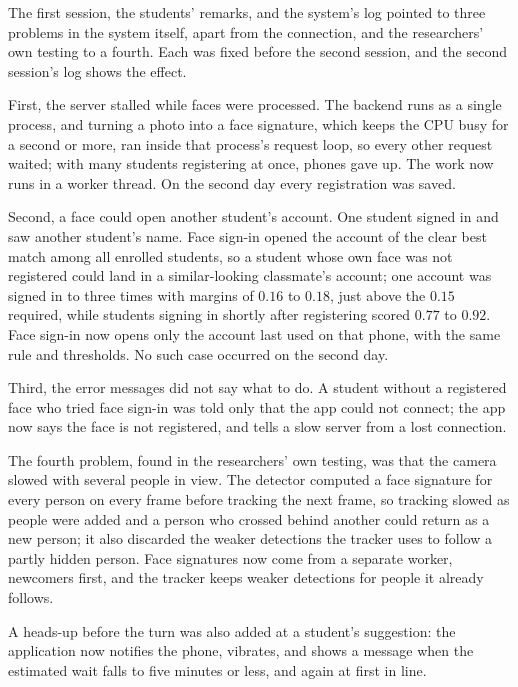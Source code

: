 \documentclass{research}
\begin{document}
\label{subsec:uat-fixes}

The first session, the students' remarks, and the system's log pointed to
three problems in the system itself, apart from the connection, and the
researchers' own testing to a fourth. Each was fixed before the second
session, and the second session's log shows the effect.

First, the server stalled while faces were processed. The backend runs
as a single process, and turning a photo into a face signature, which
keeps the CPU busy for a second or more, ran inside that process's
request loop, so every other request waited; with many students
registering at once, phones gave up. The work now runs in a worker
thread. On the second day every registration was saved.

Second, a face could open another student's account. One student signed
in and saw another student's name. Face sign-in opened the account of
the clear best match among all enrolled students, so a student whose own
face was not registered could land in a similar-looking classmate's
account; one account was signed in to three times with margins of $0.16$
to $0.18$, just above the $0.15$ required, while students signing in
shortly after registering scored $0.77$ to $0.92$. Face sign-in now
opens only the account last used on that phone, with the same rule and
thresholds. No such case occurred on the second day.

Third, the error messages did not say what to do. A student without a
registered face who tried face sign-in was told only that the app could
not connect; the app now says the face is not registered, and tells a
slow server from a lost connection.

The fourth problem, found in the researchers' own testing, was that the
camera slowed with several people in view. The detector
computed a face signature for every person on every frame before
tracking the next frame, so tracking slowed as people were added and a
person who crossed behind another could return as a new person; it also
discarded the weaker detections the tracker uses to follow a partly hidden
person. Face signatures now come from a separate worker, newcomers first,
and the tracker keeps weaker detections for people it already follows.

A heads-up before the turn was also added at a student's suggestion:
the application now notifies the phone, vibrates, and shows a message when
the estimated wait falls to five minutes or less, and again at first in
line.
\end{document}
